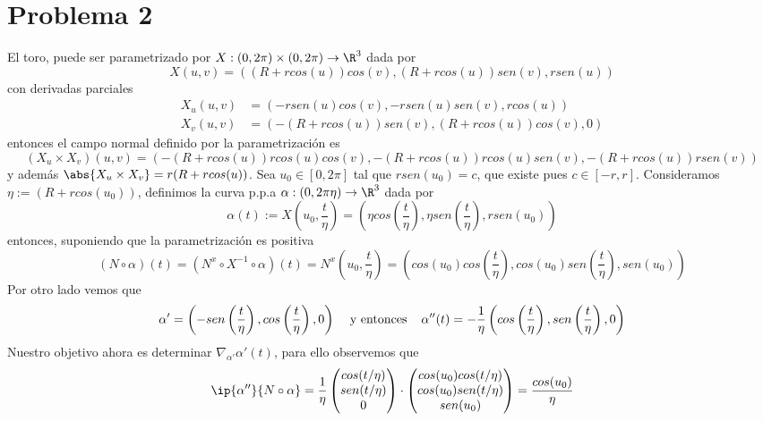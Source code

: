 \documentclass{article}
\begin{document}
\section*{Problema 2}
\noindent El toro, puede ser parametrizado por $X:(0,2\pi)\times(0,2\pi)\to\R^{3}$ dada por
\begin{equation*}
    X(u,v)=((R+rcos(u))cos(v),(R+rcos(u))sen(v),rsen(u))
\end{equation*}
con derivadas parciales
\begin{align*}
    X_{u}(u,v) &= (-rsen(u)cos(v),-rsen(u)sen(v),rcos(u)) \\
    X_{v}(u,v) &= (-(R+rcos(u))sen(v),(R+rcos(u))cos(v),0)
\end{align*}
entonces el campo normal definido por la parametrización es
\begin{equation*}
    (X_{u}\times X_{v})(u,v)=(-(R+rcos(u))rcos(u)cos(v),-(R+rcos(u))rcos(u)sen(v),
    -(R+rcos(u))rsen(v))
\end{equation*}
y además $\abs{X_{u}\times X_{v}}=r(R+rcos(u))$. Sea $u_{0}\in[0,2\pi]$ tal que $rsen(u_{0})=c$, 
que existe pues $c\in[-r,r]$. Consideramos $\eta:=(R+rcos(u_{0}))$, definimos la curva p.p.a 
$\alpha:(0,2\pi\eta)\to\R^{3}$ dada por
\begin{equation*}
    \alpha(t):=X\left(u_{0},\frac{t}{\eta}\right)=\left(\eta cos\left(\frac{t}{\eta}\right),
    \eta sen\left(\frac{t}{\eta}\right),rsen(u_{0})\right)
\end{equation*}
entonces, suponiendo que la parametrización es positiva
\begin{equation*}
    (N\circ\alpha)(t)=(N^{x}\circ X^{-1}\circ\alpha)(t)=N^{x}\left(u_{0},\frac{t}{\eta}\right)
    =\left(cos(u_{0})cos\left(\frac{t}{\eta}\right),cos(u_{0})sen\left(\frac{t}{\eta}\right),
    sen(u_{0})\right)
\end{equation*}
Por otro lado vemos que
\begin{equation*}
    \alpha'=\left(-sen\left(\frac{t}{\eta}\right),cos\left(\frac{t}{\eta}\right),0\right)
    \hspace{4mm}\text{y entonces}\hspace{4mm}
    \alpha''(t)=-\frac{1}{\eta}\left(cos\left(\frac{t}{\eta}\right),
    sen\left(\frac{t}{\eta}\right),0\right)
\end{equation*}
Nuestro objetivo ahora es determinar $\nabla_{\alpha'}\alpha'(t)$, para ello observemos que
\begin{equation*}
    \ip{\alpha''}{N\circ\alpha}=\frac{1}{\eta}\begin{pmatrix}
        cos(t/\eta) \\ sen(t/\eta) \\ 0
    \end{pmatrix}\cdot\begin{pmatrix}
        cos(u_{0})cos(t/\eta) \\ cos(u_{0})sen(t/\eta) \\ sen(u_{0})
    \end{pmatrix}=\frac{cos(u_{0})}{\eta}
\end{equation*}
\end{document}
